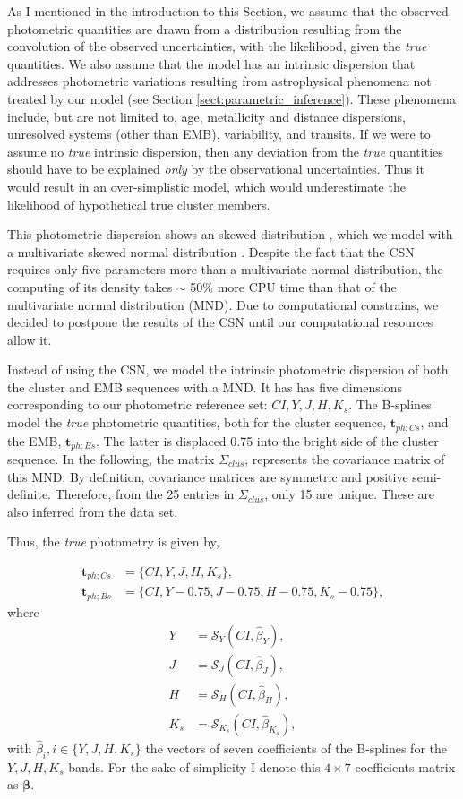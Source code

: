 {\color{blue}
As I mentioned in the introduction to this Section, we assume that the observed photometric quantities are drawn from a distribution resulting from the convolution of the observed uncertainties, with the likelihood, given the \emph{true} quantities. We also assume that the model has an intrinsic dispersion that addresses photometric variations resulting from astrophysical phenomena not treated by our model (see Section \ref{sect:parametric_inference}). These phenomena include, but are not limited to, age, metallicity and distance dispersions, unresolved systems (other than EMB), variability, and transits. If we were to assume no \emph{true} intrinsic dispersion, then any deviation from the \emph{true} quantities should have to be explained \emph{only} by the observational uncertainties. Thus it would result in an over-simplistic model, which would underestimate the likelihood of hypothetical true cluster members. 

This photometric dispersion shows an skewed distribution \cite[see Figure X of][which I reproduce in Fig. \ref{}]{}, which we model with a multivariate skewed normal distribution \cite[CSN,][]{}. Despite the fact that the CSN requires only five parameters more than a multivariate normal distribution, the computing of its density takes $\sim$ 50\% more CPU time than that of the multivariate normal distribution (MND). Due to computational constrains, we decided to postpone the results of the CSN until our computational resources allow it. 

Instead of using the CSN, we model the intrinsic photometric  dispersion of both the cluster and EMB sequences with a MND. It has has five dimensions corresponding to our photometric reference set: $CI,Y,J,H,K_s$. The B-splines model the \emph{true} photometric quantities, both for the cluster sequence, $\mathbf{t}_{ph;Cs}$, and the EMB, $\mathbf{t}_{ph;Bs}$. The latter is displaced 0.75 into the bright side of the cluster sequence. In the following, the matrix $\Sigma_{clus}$, represents the covariance matrix of this MND. By definition, covariance matrices are symmetric and positive semi-definite. Therefore, from the 25 entries in $\Sigma_{clus}$, only 15 are unique. These are also inferred from the data set.
}

Thus, the \emph{true} photometry is given by,

\begin{align}
\mathbf{t}_{ph;Cs}&= \{CI,Y,J,H,K_s\},\nonumber \\
\mathbf{t}_{ph;Bs}&=\{CI,Y-0.75,J-0.75,H-0.75,K_s-0.75\}, \nonumber
\end{align}
where
\begin{align}
Y &=\mathcal{S}_Y(CI,\hat{\beta}_Y), \nonumber \\
J &=\mathcal{S}_J(CI,\hat{\beta}_J),\nonumber \\
 H &=\mathcal{S}_H(CI,\hat{\beta}_H), \nonumber \\
 K_s &=\mathcal{S}_{K_s}(CI,\hat{\beta}_{K_s}),  \nonumber 
\end{align}
with $\hat{\beta}_{i}, i\in\{Y,J,H,K_s\}$ the vectors of seven coefficients of the B-splines for the $Y,J,H,K_s$ bands.  For the sake of simplicity I denote this $4\times7$ coefficients matrix as $\boldsymbol{\beta}$.

